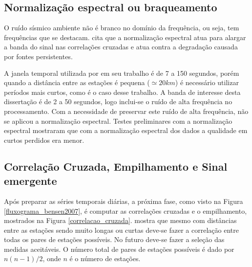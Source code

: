 \subsection{Normalização espectral ou braqueamento}

O ruído sísmico ambiente não é branco no domínio da frequência, ou seja, tem frequências que se destacam. \cite{bensen_processing_2007} cita que a normalização espectral atua para alargar a banda do sinal nas correlações cruzadas e atua contra a degradação causada por fontes persistentes.

A janela temporal  utilizada por \cite{bensen_processing_2007} em seu trabalho é de 7 a 150 segundos, porém quando a distância entre as estações é pequena ($\simeq 20 km$) é necessário utilizar períodos mais curtos, como é o caso desse trabalho. A banda de interesse desta dissertação é de 2 a 50 segundos, logo inclui-se o ruído de alta frequência no processamento. Com a necessidade de preservar este ruído de alta frequência, não se aplicou a normalização espectral. Testes preliminares com a normalização espectral mostraram que com a normalização espectral dos dados a qualidade em curtos perdidos era menor. 


\subsection{Correlação Cruzada, Empilhamento e  Sinal emergente}

Após preparar as séries temporais diárias, a próxima fase, como visto na Figura \ref{fluxograma_bensen2007}, é computar as correlações cruzadas e o empilhamento, mostrados na Figura \ref{correlacao_cruzada}. \cite{bensen_processing_2007} mostra que mesmo com distâncias entre as estações sendo muito longas ou curtas deve-se fazer a correlação entre todas os pares de estações possíveis. No futuro deve-se fazer a seleção das medidas aceitáveis. O número total de pares de estações possíveis é dado por $n(n-1)/2$, onde $n$ é o número de estações.

